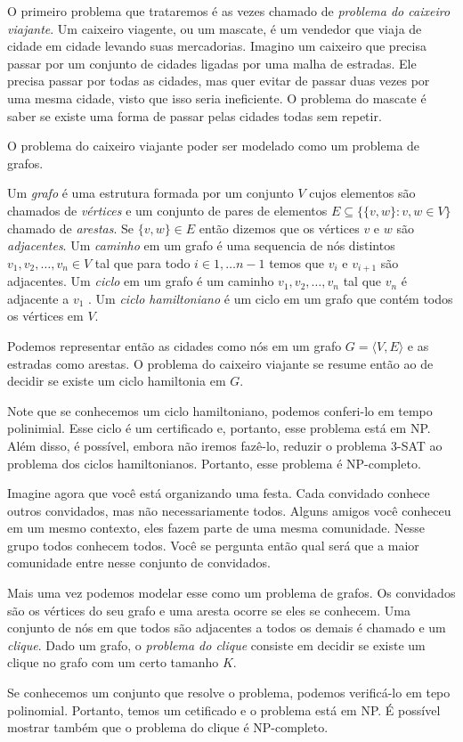 \begin{example}
  O primeiro problema que trataremos é as vezes chamado de {\em problema do caixeiro viajante}.
  Um caixeiro viagente, ou um mascate, é um vendedor que viaja de cidade em cidade levando suas mercadorias.
  Imagino um caixeiro que precisa passar por um conjunto de cidades ligadas por uma malha de estradas.
  Ele precisa passar por todas as cidades, mas quer evitar de passar duas vezes por uma mesma cidade, visto que isso seria ineficiente.
  O problema do mascate é saber se existe uma forma de passar pelas cidades todas sem repetir.

  O problema do caixeiro viajante poder ser modelado como um problema de grafos.

  Um {\em grafo} é uma estrutura formada por um conjunto $V$ cujos elementos são chamados de {\em vértices} e um conjunto de pares de elementos $E \subseteq \{\{v,w\} : v, w \in V\}$ chamado de {\em arestas}.
  Se $\{v,w\} \in E$ então dizemos que os vértices $v$ e $w$ são {\em adjacentes}. 
  Um {\em caminho} em um grafo é uma sequencia de nós distintos $v_1, v_2, \dots, v_n \in V$ tal que para todo $i \in {1, \dots n-1}$ temos que $v_i$ e $v_{i+1}$ são adjacentes.
  Um {\em ciclo} em um grafo é um caminho $v_1, v_2, \dots, v_n$ tal que $v_n$ é adjacente a $v_1$ .
  Um {\em ciclo hamiltoniano} é um ciclo em um grafo que contém todos os vértices em $V$.

  Podemos representar então as cidades como nós em um grafo $G = \langle V, E \rangle$ e as estradas como arestas.
  O problema do caixeiro viajante se resume então ao de decidir se existe um ciclo hamiltonia em $G$.

  Note que se conhecemos um ciclo hamiltoniano, podemos conferi-lo em tempo polinimial.
  Esse ciclo é um certificado e, portanto, esse problema está em NP.
  Além disso, é possível, embora não iremos fazê-lo, reduzir o problema 3-SAT ao problema dos ciclos hamiltonianos.
  Portanto, esse problema é NP-completo.
\end{example}

\begin{example}
  Imagine agora que você está organizando uma festa.
  Cada convidado conhece outros convidados, mas não necessariamente todos.
  Alguns amigos você conheceu em um mesmo contexto, eles fazem parte de uma mesma comunidade.
  Nesse grupo todos conhecem todos.
  Você se pergunta então qual será que a maior comunidade entre nesse conjunto de convidados.

  Mais uma vez podemos modelar esse como um problema de grafos.
  Os convidados são os vértices do seu grafo e uma aresta ocorre se eles se conhecem.
  Uma conjunto de nós em que todos são adjacentes a todos os demais é chamado e um {\em clique}.
  Dado um grafo, o {\em problema do clique} consiste em decidir se existe um clique no grafo com um certo tamanho $K$.

  Se conhecemos um conjunto que resolve o problema, podemos verificá-lo em tepo polinomial.
  Portanto, temos um cetificado e o problema está em NP.
  É possível mostrar também que o problema do clique é NP-completo.
\end{example}

